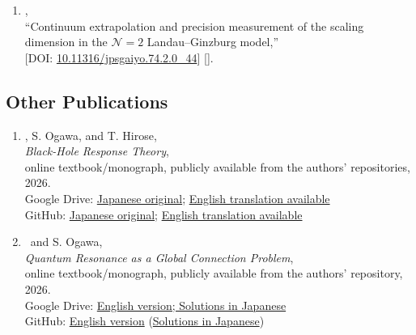 \begin{enumerate}
       ``Identification of perturbative ambiguity canceled against bion,''\\
       [].
 \item \OM,\\
       ``Continuum extrapolation and precision measurement of the scaling dimension in the $\mathcal{N}=2$ Landau--Ginzburg model,''\\
       [DOI: \href{https://doi.org/10.11316/jpsgaiyo.74.2.0_44}{10.11316/jpsgaiyo.74.2.0\_44}]
       [].
\end{enumerate}

\subsection{Other Publications}
\begin{enumerate}
 \item \OM, S. Ogawa, and T. Hirose,\\
       \textit{Black-Hole Response Theory},\\
       online textbook/monograph, publicly available from the authors' repositories, 2026.\\
       Google Drive:
       \href{https://drive.google.com/drive/folders/1bE54ZLT_4eVw0gg5K4qJEvqR-aRm_I25?usp=drive_link}
       {Japanese original};
       \href{https://drive.google.com/drive/folders/1U3TYsaFRWobJtyxpUL7_IHK3pjfCCQKv?usp=drive_link}{English translation available}\\
       GitHub:
       \href{https://o-morikawa.github.io/books/bh_responce_textbook/main.pdf}{Japanese original};
       \href{https://o-morikawa.github.io/books/bh_responce_en_textbook/main.pdf}{English translation available}
 \item \OM\ and S. Ogawa,\\
       \textit{Quantum Resonance as a Global Connection Problem},\\
       online textbook/monograph, publicly available from the authors' repository, 2026.\\
       Google Drive:
       \href{https://drive.google.com/drive/folders/1qR1iONTnf2iShU-10wzj6FHL45_-zuMj?usp=drive_link}
       {English version; Solutions in Japanese}\\
       GitHub:
       \href{https://o-morikawa.github.io/books/quantum_resonance_monograph/main.pdf}{English version}
       (\href{https://o-morikawa.github.io/books/quantum_resonance_monograph/solutions_ja.pdf}{Solutions in Japanese})
\end{enumerate}

